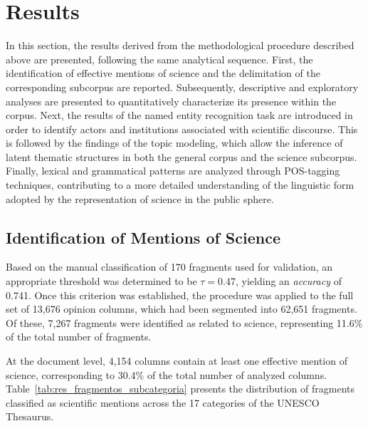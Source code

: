 \documentclass[pdflatex,sn-mathphys-num,iicol]{sn-jnl}
\begin{document}
	\section{Results}\label{sec:results}
	
	In this section, the results derived from the methodological procedure described above are presented, following the same analytical sequence. First, the identification of effective mentions of science and the delimitation of the corresponding subcorpus are reported. Subsequently, descriptive and exploratory analyses are presented to quantitatively characterize its presence within the corpus. Next, the results of the named entity recognition task are introduced in order to identify actors and institutions associated with scientific discourse. This is followed by the findings of the topic modeling, which allow the inference of latent thematic structures in both the general corpus and the science subcorpus. Finally, lexical and grammatical patterns are analyzed through POS-tagging techniques, contributing to a more detailed understanding of the linguistic form adopted by the representation of science in the public sphere.
	
	\subsection{Identification of Mentions of Science}\label{subsec:mentions}
	
	Based on the manual classification of 170 fragments used for validation, an appropriate threshold was determined to be $\tau = 0.47$, yielding an \emph{accuracy} of 0.741. Once this criterion was established, the procedure was applied to the full set of 13,676 opinion columns, which had been segmented into 62,651 fragments. Of these, 7,267 fragments were identified as related to science, representing 11.6\% of the total number of fragments.
	
	At the document level, 4,154 columns contain at least one effective mention of science, corresponding to 30.4\% of the total number of analyzed columns. Table~\ref{tab:res_fragmentos_subcategoria} presents the distribution of fragments classified as scientific mentions across the 17 categories of the UNESCO Thesaurus.
	
\end{document}
